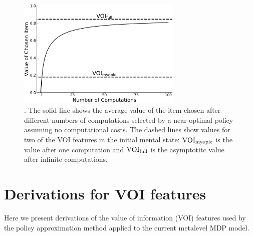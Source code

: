 \begin{figure}[b!]
  \centering
  \includegraphics[width=0.7\textwidth]{figs/attention/supp-voi-vpi.pdf}
  \caption{.
    The solid line shows the average value of the item chosen after different numbers of computations selected by a near-optimal policy assuming no computational costs. The dashed lines show values for two of the VOI features in the initial mental state: $\text{VOI}_\text{myopic}$ is the value after one computation and $\text{VOI}_\text{full}$ is the asymptotitc value after infinite computations.
  }
  \label{fig:attention-voi}
\end{figure}


\section{Derivations for VOI features}\label{app:attention-derivations}

Here we present derivations of the value of information (VOI) features used by the policy approximation method \citep{callaway2018learning} applied to the current metalevel MDP model.

